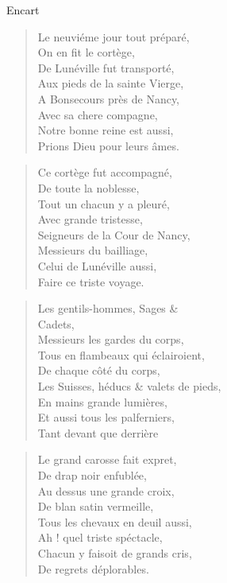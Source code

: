 \begin{diary}{Encart}{}
        \begin{verse}Le neuviéme jour tout préparé,\\On en fit le cortège,\\De Lunéville fut
                                 transporté,\\Aux pieds de la sainte Vierge,\\A Bonsecours près de
                                    Nancy,\\Avec sa chere compagne,\\Notre bonne reine est
                                 aussi,\\Prions Dieu pour leurs âmes.\\\end{verse}
        \bigskip
        
        \begin{verse}Ce cortège fut accompagné,\\De toute la noblesse,\\Tout un chacun y a pleuré,\\Avec grande tristesse,\\Seigneurs de la Cour de Nancy,\\Messieurs du bailliage,\\Celui de Lunéville
                                 aussi,\\Faire ce triste voyage.\\\end{verse}
        \bigskip
        
        \begin{verse}Les gentils-hommes, Sages & \\Cadets,\\Messieurs les gardes du corps,\\Tous en flambeaux qui éclairoient,\\De chaque côté du corps,\\Les Suisses, héducs & valets de
                                 pieds,\\En mains grande lumières,\\Et aussi tous les palferniers,\\Tant devant que derrière\\\end{verse}
        \bigskip
        
        \begin{verse}Le grand carosse fait expret,\\De drap noir enfublée,\\Au dessus une grande croix,\\De blan satin vermeille,\\Tous les chevaux en deuil aussi,\\Ah ! quel triste spéctacle,\\Chacun y faisoit de grands cris,\\De regrets déplorables.\\\end{verse}
        \bigskip
        

\end{diary}
